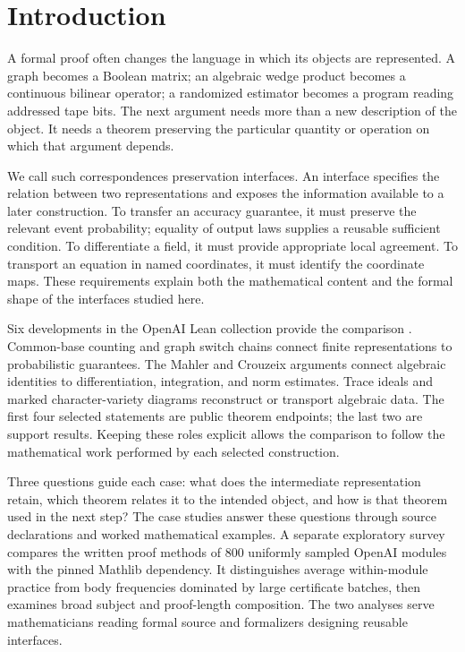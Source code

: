 \section{Introduction}

A formal proof often changes the language in which its objects are
represented. A graph becomes a Boolean matrix; an algebraic wedge product
becomes a continuous bilinear operator; a randomized estimator becomes a
program reading addressed tape bits. The next argument needs more than a
new description of the object. It needs a theorem preserving the
particular quantity or operation on which that argument depends.

We call such correspondences preservation interfaces. An interface
specifies the relation between two representations and exposes the
information available to a later construction. To transfer an accuracy
guarantee, it must preserve the relevant event probability; equality of
output laws supplies a reusable sufficient condition. To differentiate a
field, it must provide appropriate local agreement. To transport an
equation in named coordinates, it must identify the coordinate maps.
These requirements explain both the mathematical content and the formal
shape of the interfaces studied here.

Six developments in the OpenAI Lean collection provide the comparison
\citep{OAIRepository}. Common-base counting and graph switch chains
connect finite representations to probabilistic guarantees. The Mahler
and Crouzeix arguments connect algebraic identities to differentiation,
integration, and norm estimates. Trace ideals and marked character-variety
diagrams reconstruct or transport algebraic data. The first four selected
statements are public theorem endpoints; the last two are support results.
Keeping these roles explicit allows the comparison to follow the
mathematical work performed by each selected construction.

Three questions guide each case: what does the intermediate representation
retain, which theorem relates it to the intended object, and how is that
theorem used in the next step? The case studies answer these questions
through source declarations and worked mathematical examples. A separate
exploratory survey compares the written proof methods of 800 uniformly
sampled OpenAI modules with the pinned Mathlib dependency. It distinguishes
average within-module practice from body frequencies dominated by large
certificate batches, then examines broad subject and proof-length
composition. The two analyses serve mathematicians reading formal source
and formalizers designing reusable interfaces.

